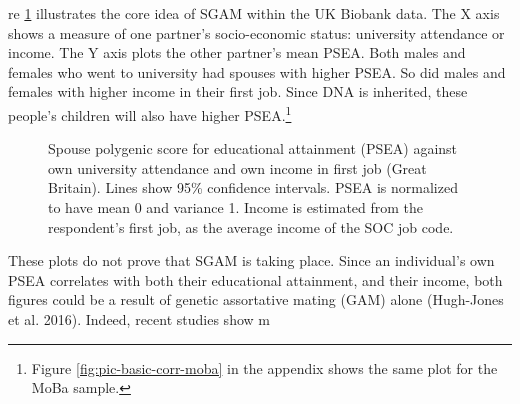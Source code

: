 \documentclass[
  12pt,
]{article}
\theoremstyle{definition}
\theoremstyle{definition}
\theoremstyle{definition}
\theoremstyle{definition}
\theoremstyle{remark}
\begin{document}
re \ref{fig:pic-basic-corr} illustrates the core idea of SGAM within the UK
Biobank data. The X axis shows a measure of one partner's socio-economic status:
university attendance or income. The Y axis plots the other partner's mean PSEA.
Both males and females who went to university had spouses with higher PSEA. So
did males and females with higher income in their first job. Since DNA is
inherited, these people's children will also have higher PSEA.\footnote{Figure \ref{fig:pic-basic-corr-moba} in the appendix shows
  the same plot for the MoBa sample.}

\begin{figure}

{\centering {}\newline{}

}

\caption{Spouse polygenic score for educational attainment (PSEA) against own university attendance and own income in first job (Great Britain). Lines show 95\% confidence intervals. PSEA is normalized to have mean 0 and variance 1. Income is estimated from the respondent's first job, as the average income of the SOC job code.}\label{fig:pic-basic-corr}
\end{figure}

These plots do not prove that SGAM is taking place. Since an
individual's own PSEA correlates with both their educational attainment,
and their income, both figures could be a result of genetic assortative
mating (GAM) alone (Hugh-Jones et al. 2016). Indeed, recent studies show m
\end{document}
